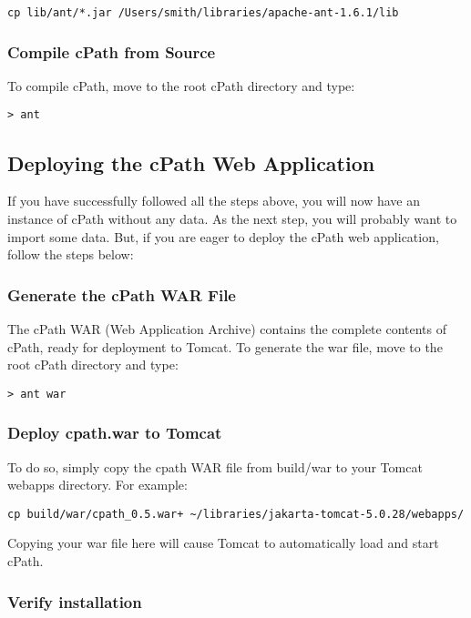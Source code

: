 \documentclass[letterpaper,12pt]{article}
\begin{document}
\bigskip

\texttt{cp lib/ant/*.jar /Users/smith/libraries/apache-ant-1.6.1/lib}

\subsubsection{Compile cPath from Source}

To compile cPath, move to the root cPath directory and type:

\begin{verbatim}
> ant
\end{verbatim}

\subsection{Deploying the cPath Web Application}

If you have successfully followed all the steps above, you will now have an instance of cPath without any data.  As the next step, you will probably want to import some data.  But, if you are eager to deploy the cPath web application, follow the steps below:

\subsubsection{Generate the cPath WAR File}  
\label{generate-war}

The cPath WAR (Web Application Archive) contains the complete contents of cPath, ready for deployment to Tomcat. To generate the war file, move to the root cPath directory and type:

\begin{verbatim}
> ant war
\end{verbatim}

\subsubsection{Deploy cpath.war to Tomcat}

To do so, simply copy the cpath WAR file from build/war to your Tomcat webapps directory. For example:
\begin{verbatim}
cp build/war/cpath_0.5.war+ ~/libraries/jakarta-tomcat-5.0.28/webapps/
\end{verbatim}

Copying your war file here will cause Tomcat to automatically load and start cPath.

\subsubsection{Verify installation}
\end{document}
